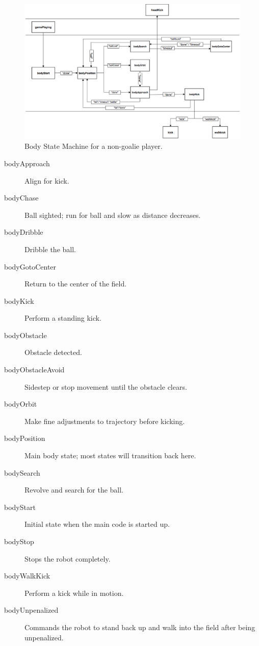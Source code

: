 \documentclass{article}
\begin{document}
	\begin{figure}[H]
		\centering
		\includegraphics[width=\textwidth]{figures/NewBodyFSM.eps}
		\caption{Body State Machine for a non-goalie player.}
		\label{fig:bodyfsm}
	\end{figure}
		
	\begin{multicols}{2}
		\begin{description}
			\item[bodyApproach] Align for kick.
			\item[bodyChase] Ball sighted; run for ball and slow as distance decreases.
			\item[bodyDribble] Dribble the ball.
			\item[bodyGotoCenter] Return to the center of the field.
			\item[bodyKick] Perform a standing kick.
			\item[bodyObstacle] Obstacle detected.
			\item[bodyObstacleAvoid] Sidestep or stop movement until the obstacle clears.
			\item[bodyOrbit] Make fine adjustments to trajectory before kicking.
			\item[bodyPosition] Main body state; most states will transition back here.
			\item[bodySearch] Revolve and search for the ball.
			\item[bodyStart] Initial state when the main code is started up. 
			\item[bodyStop] Stops the robot completely.
			\item[bodyWalkKick] Perform a kick while in motion.
			\item[bodyUnpenalized] Commands the robot to stand back up and walk into the field after being unpenalized.
		\end{description}
	\end{multicols}
\end{document}
